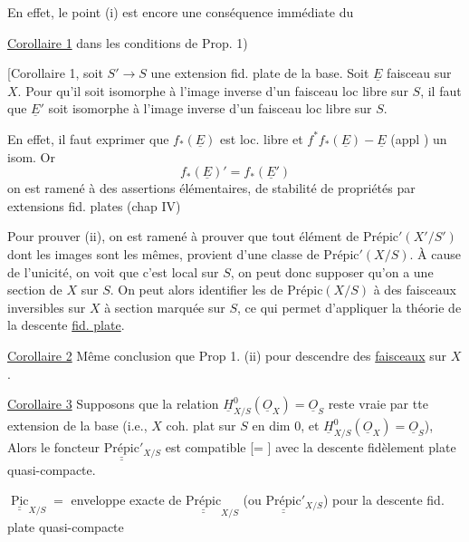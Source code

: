  En effet, le point (i) est encore une conséquence immédiate du

\uline{Corollaire 1} dans les conditions de Prop. 1)

[Corollaire 1, soit $S'\to S$ une extension fid. plate  de la base. Soit $\underline E$ faisceau  sur $X$. Pour qu'il soit isomorphe à l'image inverse d'un faisceau loc libre  sur $S$, il faut que $\underline E'$ soit isomorphe à l'image inverse d'un faisceau loc libre sur $S$.

En effet, il faut exprimer que $f_*(\underline E)$ est loc. libre et \deleted{$\unsure{\xi}$} $f^*f_*(\underline E)-\underline E$ (appl ) un isom. Or
\[
f_*(\underline E)'=f_*(\underline E')
\]
on est ramené à des assertions élémentaires, de stabilité de propriétés par extensions fid. plates (chap IV)

Pour prouver (ii), on est ramené à prouver que tout élément de $\mathrm{Prépic}'(X'/S')$ dont les images sont les mêmes, provient d'une classe de $\mathrm{Prépic}'(X/S)$. À cause de l'unicité, on voit que c'est local sur $S$, on peut donc supposer qu'on a une section de $X$ sur $S$. On peut alors identifier les  de $\mathrm{Prépic}(X/S)$ à des faisceaux inversibles  sur $X$ à section marquée sur $S$, ce qui permet d'appliquer la théorie de la descente \uline{fid. plate}.

\uline{Corollaire 2} Même conclusion que Prop 1. (ii) pour descendre des \uline{faisceaux} sur $X$.

\uline{Corollaire 3} Supposons que la relation $\underline H^0_{X/S}(\underline O_X)=\underline O_S$ reste vraie par tte extension de la base (i.e., $X$ coh. plat sur $S$ en dim 0, et $\underline H^0_{X/S}(\underline O_X)=\underline O_S$),  Alors le foncteur $\underline{\underline{\mathrm{Prépic}}}'_{X/S}$ est compatible [= ] avec la descente fidèlement plate quasi-compacte.


$\underline{\underline{\operatorname{Pic}}}_{X/S}=$ enveloppe exacte de $\underline{\underline{\mathrm{Prépic}}}_{X/S}$ (ou $\underline{\underline{\mathrm{Prépic}}}'_{X/S}$) pour la descente fid. plate quasi-compacte

